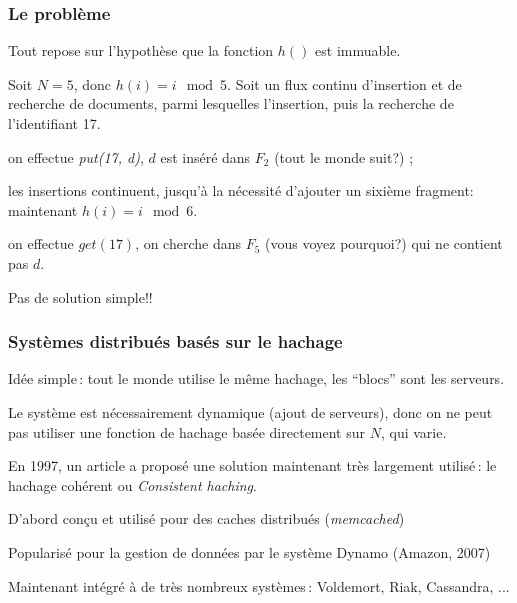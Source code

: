 \begin{frame}
\frametitle{Le problème}


Tout repose  sur l'hypothèse que la fonction $h()$ est \alert{immuable}.

\vfill
 Soit $N=5$, donc  $h(i) = i \mod 5$. Soit un flux
continu d'insertion et de recherche de documents, parmi lesquelles
l'insertion, puis la recherche de l'identifiant 17. 
 
\begin{redbullet}
   \item  on effectue \textit{put(17, d)}, $d$ est inséré dans $F_2$ (tout le monde suit?) ;
  \item les insertions continuent, jusqu'à la nécessité d'ajouter
      un sixième fragment: maintenant $h(i) = i \mod 6$.
   \item on effectue $get(17)$, on cherche dans $F_5$
      (vous voyez pourquoi?) qui ne contient pas $d$.
\end{redbullet}      

\alert{Pas de solution simple!!}
\end{frame}

\begin{frame}
\frametitle{Systèmes distribués basés sur le hachage}

Idée simple\,: tout le monde utilise le même hachage, les ``blocs''
sont les serveurs.

\vfill

Le système est nécessairement \alert{dynamique} (ajout  de serveurs), donc
on ne peut pas utiliser une fonction de hachage basée directement sur $N$, 
qui varie.


\vfill

En 1997, un article a proposé une solution maintenant très largement utilisé\,: le
\alert{hachage cohérent} ou \textit{Consistent haching}.


\begin{redbullet}
  \item D'abord conçu et utilisé pour des \alert{caches distribués} (\textit{memcached})

  \item Popularisé pour la gestion de données par le système Dynamo (Amazon, 2007)

  \item Maintenant intégré à de très nombreux systèmes\,: Voldemort, Riak, Cassandra, ...
 
\end{redbullet}
\end{frame}

